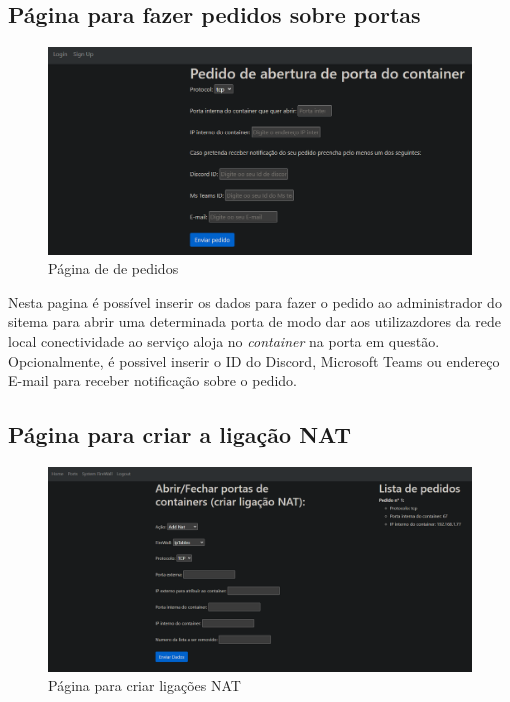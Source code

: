 \subsection{Página para fazer pedidos sobre portas}

\begin{figure}[H]
\begin{center}
\includegraphics[width=16cm]{figs/pagina de pedidos2.png}
\caption{Página de de pedidos}
\label{fig:bookstack}
\end{center}
\end{figure}

Nesta pagina é possível inserir os dados para fazer o pedido ao administrador do
sitema para abrir uma determinada porta de modo dar aos utilizazdores da rede local
conectividade ao serviço aloja no \textit{container} na porta em questão. \\

Opcionalmente, é possivel inserir o ID do Discord, Microsoft Teams ou endereço E-mail
para receber notificação sobre o pedido.

\subsection{Página para criar a ligação NAT}

\begin{figure}[H]
\begin{center}
\includegraphics[width=16cm]{figs/criar nat 2.png}
\caption{Página para criar ligações NAT}
\label{fig:bookstack}
\end{center}
\end{figure}

